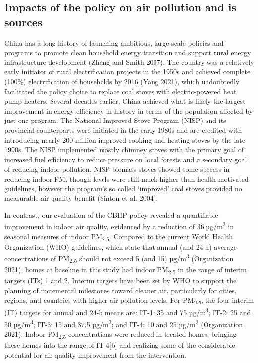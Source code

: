 \documentclass[
  letterpaper,
  DIV=11,
  numbers=noendperiod]{scrartcl}
\begin{document}
\hypertarget{impacts-of-the-policy-on-air-pollution-and-is-sources}{%
\subsection{Impacts of the policy on air pollution and is
sources}\label{impacts-of-the-policy-on-air-pollution-and-is-sources}}

China has a long history of launching ambitious, large-scale policies
and programs to promote clean household energy transition and support
rural energy infrastructure development (Zhang and Smith 2007). The
country was a relatively early initiator of rural electrification
projects in the 1950s and achieved complete (100\%) electrification of
households by 2016 (Yang 2021), which undoubtedly facilitated the policy
choice to replace coal stoves with electric-powered heat pump heaters.
Several decades earlier, China achieved what is likely the largest
improvement in energy efficiency in history in terms of the population
affected by just one program. The National Improved Stove Program (NISP)
and its provincial counterparts were initiated in the early 1980s and
are credited with introducing nearly 200 million improved cooking and
heating stoves by the late 1990s. The NISP implemented mostly chimney
stoves with the primary goal of increased fuel efficiency to reduce
pressure on local forests and a secondary goal of reducing indoor
pollution. NISP biomass stoves showed some success in reducing indoor
PM, though levels were still much higher than health-motivated
guidelines, however the program's so called `improved' coal stoves
provided no measurable air quality benefit (Sinton et al. 2004).

In contrast, our evaluation of the CBHP policy revealed a quantifiable
improvement in indoor air quality, evidenced by a reduction of 36
µg/m\textsuperscript{3} in seasonal measures of indoor
PM\textsubscript{2.5}. Compared to the current World Health Organization
(WHO) guidelines, which state that annual (and 24-h) average
concentrations of PM\textsubscript{2.5} should not exceed 5 (and 15)
µg/m\textsuperscript{3} (Organization 2021), homes at baseline in this
study had indoor PM\textsubscript{2.5} in the range of interim targets
(ITs) 1 and 2. Interim targets have been set by WHO to support the
planning of incremental milestones toward cleaner air, particularly for
cities, regions, and countries with higher air pollution levels. For
PM\textsubscript{2.5}, the four interim (IT) targets for annual and 24-h
means are: IT-1: 35 and 75 µg/m\textsuperscript{3}; IT-2: 25 and 50
µg/m\textsuperscript{3}; IT-3: 15 and 37.5 µg/m\textsuperscript{3}; and
IT-4: 10 and 25 µg/m\textsuperscript{3} (Organization 2021). Indoor
PM\textsubscript{2.5} concentrations were reduced in treated homes,
bringing these homes into the range of IT-4{[}b{]} and realizing some of
the considerable potential for air quality improvement from the
intervention.
\end{document}
